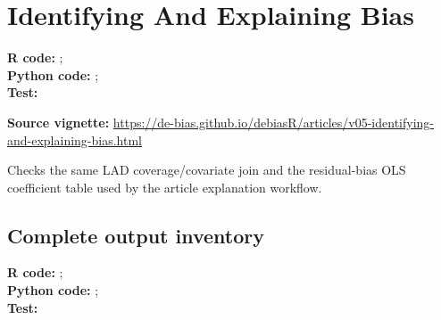 \documentclass[10pt]{article}
\begin{document}
\section{Identifying And Explaining Bias}
{\footnotesize \textbf{R code:} ; \\ \textbf{Python code:} ; \\ \textbf{Test:} \par}


\textbf{Source vignette:} \url{https://de-bias.github.io/debiasR/articles/v05-identifying-and-explaining-bias.html}



Checks the same LAD coverage/covariate join and the residual-bias OLS coefficient table used by the article explanation workflow.



\subsection{Complete output inventory}
{\footnotesize \textbf{R code:} ; \\ \textbf{Python code:} ; \\ \textbf{Test:} \par}
\end{document}
